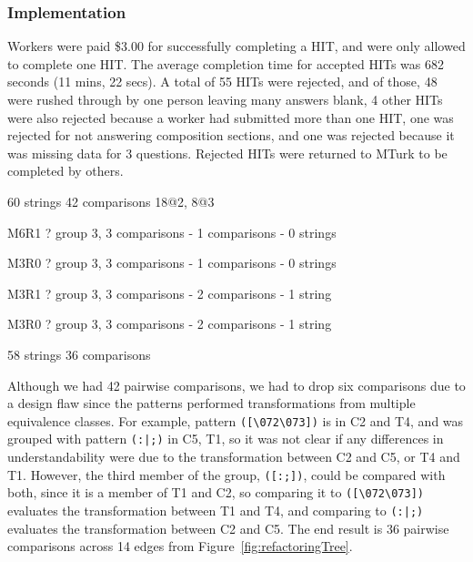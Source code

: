\subsubsection{Implementation}
Workers were paid \$3.00 for successfully completing a HIT, and were only allowed to complete  one HIT.  The average completion time for accepted HITs was 682 seconds (11 mins, 22 secs).
A total of 55 HITs were rejected, and  of those, 48 were rushed through by one person leaving many answers blank, 4 other HITs were also rejected because a worker had submitted more than one HIT, one was rejected for not answering composition sections, and one was rejected because it was missing data for 3 questions.  Rejected HITs were returned to MTurk to be completed by others.


60 strings
42 comparisons
18@2, 8@3

M6R1 ? group 3, 3 comparisons
- 1 comparisons
- 0 strings

M3R0 ? group 3, 3 comparisons
- 1 comparisons
- 0 strings

M3R1 ? group 3, 3 comparisons
- 2 comparisons
- 1 string

M3R0 ? group 3, 3 comparisons
- 2 comparisons
- 1 string

58 strings
36 comparisons

Although we had 42 pairwise comparisons,  we had to drop six comparisons  due to a design flaw since the patterns performed transformations from multiple equivalence classes. For example, pattern \verb!([\072\073])! is in C2 and T4, and was grouped with pattern \verb!(:|;)! in C5, T1, so it was not clear if any differences in understandability were due to the transformation between C2 and C5, or T4 and T1. However, the third member of the group, \verb!([:;])!, could be compared with both, since it is a member of T1 and C2, so comparing it to \verb!([\072\073])! evaluates the transformation between T1 and T4, and comparing to \verb!(:|;)! evaluates the transformation between C2 and C5. The end result is 36 pairwise comparisons across 14 edges from Figure~\ref{fig:refactoringTree}.

